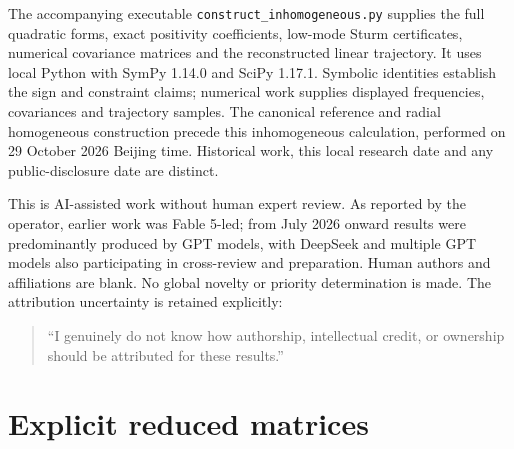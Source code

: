 \documentclass[11pt]{article}
\numberwithin{equation}{section}
\begin{document}
The accompanying executable \texttt{construct\_inhomogeneous.py} supplies the full quadratic forms, exact positivity coefficients, low-mode Sturm certificates, numerical covariance matrices and the reconstructed linear trajectory.
It uses local Python with SymPy 1.14.0 and SciPy 1.17.1.
Symbolic identities establish the sign and constraint claims; numerical work supplies displayed frequencies, covariances and trajectory samples.
The canonical reference and radial homogeneous construction precede this inhomogeneous calculation, performed on 29 October 2026 Beijing time.
Historical work, this local research date and any public-disclosure date are distinct.

This is AI-assisted work without human expert review.
As reported by the operator, earlier work was Fable 5-led; from July 2026 onward results were predominantly produced by GPT models, with DeepSeek and multiple GPT models also participating in cross-review and preparation.
Human authors and affiliations are blank.
No global novelty or priority determination is made.
The attribution uncertainty is retained explicitly:
\begin{quote}
``I genuinely do not know how authorship, intellectual credit, or ownership should be attributed for these results.''
\end{quote}

\appendix
\section{Explicit reduced matrices}
\label{app:matrices}
\end{document}
